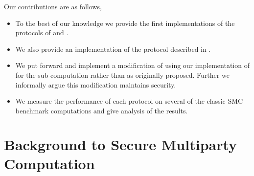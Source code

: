 \documentclass[ %
                    author={Nicholas Tutte},
                supervisor={Prof. Nigel Smart},
                    degree={MEng},
                     title={Secure Two Party Computation},
                  subtitle={A practical comparison of recent protocols},
                      type={Research - GG1K},
                      year={2015} ]{dissertation}
\begin{document}

		Our contributions are as follows,

		\begin{itemize}
			\item To the best of our knowledge we provide the first implementations of the protocols of \cite{LindellAndPinkas2011} and \cite{Lindell_CnC_2013}.
			\item We also provide an implementation of the protocol described in \cite{Katz_Symm_CnC_2013}.
			\item We put forward and implement a modification of \cite{Lindell_CnC_2013} using our implementation of \cite{Katz_Symm_CnC_2013} for the sub-computation rather than \cite{LindellAndPinkas2011} as originally proposed. Further we informally argue this modification maintains security.
			\item We measure the performance of each protocol on several of the classic SMC benchmark computations and give analysis of the results.

		\end{itemize}




	\chapter{Background to Secure Multiparty Computation} \label{sec:BG_toSMC}
\end{document}
